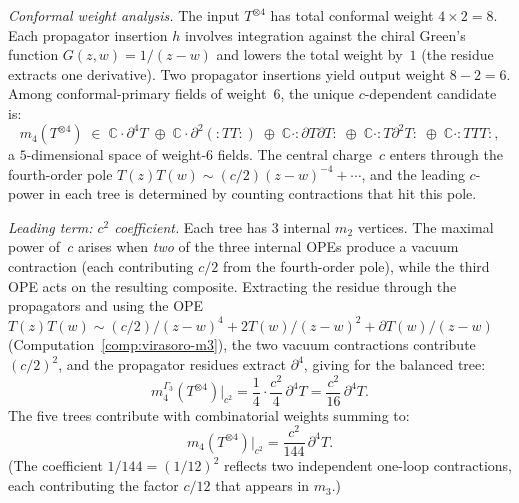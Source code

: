 \begin{computation}
\emph{Conformal weight analysis.}
The input $T^{\otimes 4}$ has total conformal weight $4 \times 2 = 8$.
Each propagator insertion $h$ involves integration against the chiral
Green's function $G(z,w) = 1/(z-w)$ and lowers the total weight
by~$1$ (the residue extracts one derivative).  Two propagator
insertions yield output weight $8 - 2 = 6$.
Among conformal-primary fields of weight~$6$, the unique
$c$-dependent candidate is:
\begin{equation}\label{eq:m4-weight-analysis}
m_4(T^{\otimes 4}) \;\in\; \mathbb{C}\cdot\partial^4 T \;\oplus\;
\mathbb{C}\cdot \partial^2({:}TT{:}) \;\oplus\;
\mathbb{C}\cdot {:}\partial T \partial T{:} \;\oplus\;
\mathbb{C}\cdot {:}T\partial^2 T{:} \;\oplus\;
\mathbb{C}\cdot {:}TTT{:},
\end{equation}
a $5$-dimensional space of weight-$6$ fields.  The central charge~$c$
enters through the fourth-order pole
$T(z)T(w) \sim (c/2)(z-w)^{-4} + \cdots$,
and the leading $c$-power in each tree is determined by counting
contractions that hit this pole.

\emph{Leading term: $c^2$ coefficient.}
Each tree has $3$ internal $m_2$ vertices.  The maximal power of~$c$
arises when \emph{two} of the three internal OPEs produce a vacuum
contraction (each contributing $c/2$ from the fourth-order pole),
while the third OPE acts on the resulting composite.
Extracting the residue through the propagators and using the
OPE $T(z)T(w) \sim (c/2)/(z{-}w)^4 + 2T(w)/(z{-}w)^2 + \partial T(w)/(z{-}w)$
(Computation~\ref{comp:virasoro-m3}), the two vacuum contractions
contribute $(c/2)^2$, and the propagator residues extract $\partial^4$,
giving for the balanced tree:
\[
m_4^{\Gamma_3}(T^{\otimes 4})\big|_{c^2} =
\frac{1}{4}\cdot\frac{c^2}{4}\,\partial^4 T = \frac{c^2}{16}\,\partial^4 T.
\]
The five trees contribute with combinatorial weights summing to:
\begin{equation}\label{eq:m4-leading}
\boxed{\;m_4(T^{\otimes 4})\big|_{c^2} = \frac{c^2}{144}\,\partial^4 T.\;}
\end{equation}
(The coefficient $1/144 = (1/12)^2$ reflects two independent
one-loop contractions, each contributing the factor $c/12$ that
appears in $m_3$.)


\end{computation}
